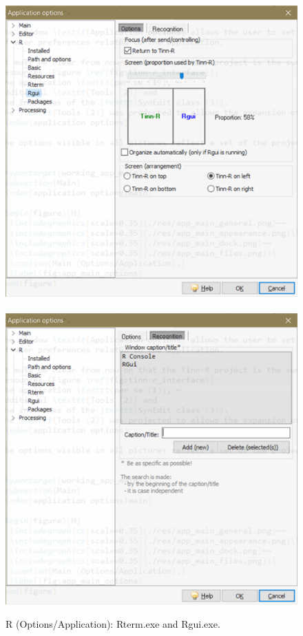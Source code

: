 \begin{figure}[h!]
  \includegraphics[scale=0.6]{./res/app_r_rgui_options.png}~~
  \includegraphics[scale=0.6]{./res/app_r_rgui_recognition.png}\\
  \caption{R (Options/Application): Rterm.exe and Rgui.exe.}
  \label{fig:app_r_d}
\end{figure}

